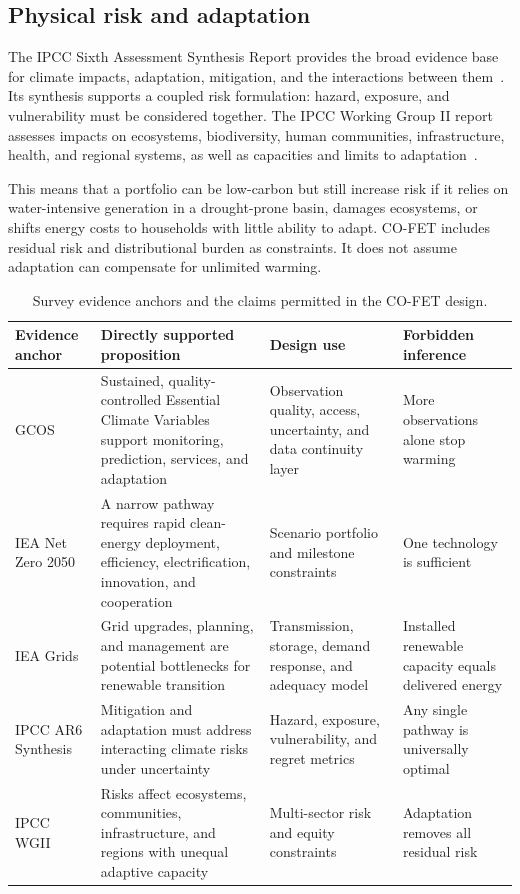 \documentclass[conference]{IEEEtran}
\begin{document}
\subsection{Physical risk and adaptation}
The IPCC Sixth Assessment Synthesis Report provides the broad evidence base for climate impacts, adaptation, mitigation, and the interactions between them~\cite{ipccsyr}. Its synthesis supports a coupled risk formulation: hazard, exposure, and vulnerability must be considered together. The IPCC Working Group II report assesses impacts on ecosystems, biodiversity, human communities, infrastructure, health, and regional systems, as well as capacities and limits to adaptation~\cite{ipccwg2}.

This means that a portfolio can be low-carbon but still increase risk if it relies on water-intensive generation in a drought-prone basin, damages ecosystems, or shifts energy costs to households with little ability to adapt. CO-FET includes residual risk and distributional burden as constraints. It does not assume adaptation can compensate for unlimited warming.

\begin{table}[t]
\centering
\caption{Survey evidence anchors and the claims permitted in the CO-FET design.}
\label{tab:evidence}
\small
\begin{tabular}{P{2.8cm}P{4.0cm}P{4.7cm}P{3.3cm}}
\toprule
Evidence anchor & Directly supported proposition & Design use & Forbidden inference \\
\midrule
GCOS~\cite{gcos} & Sustained, quality-controlled Essential Climate Variables support monitoring, prediction, services, and adaptation & Observation quality, access, uncertainty, and data continuity layer & More observations alone stop warming \\
IEA Net Zero 2050~\cite{iea2021} & A narrow pathway requires rapid clean-energy deployment, efficiency, electrification, innovation, and cooperation & Scenario portfolio and milestone constraints & One technology is sufficient \\
IEA Grids~\cite{ieagrid} & Grid upgrades, planning, and management are potential bottlenecks for renewable transition & Transmission, storage, demand response, and adequacy model & Installed renewable capacity equals delivered energy \\
IPCC AR6 Synthesis~\cite{ipccsyr} & Mitigation and adaptation must address interacting climate risks under uncertainty & Hazard, exposure, vulnerability, and regret metrics & Any single pathway is universally optimal \\
IPCC WGII~\cite{ipccwg2} & Risks affect ecosystems, communities, infrastructure, and regions with unequal adaptive capacity & Multi-sector risk and equity constraints & Adaptation removes all residual risk \\
\bottomrule
\end{tabular}
\end{table}
\end{document}
